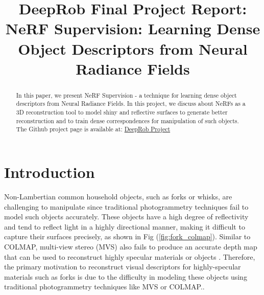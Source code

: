 \documentclass[conference]{IEEEtran}
\begin{document}
\title{DeepRob Final Project Report:\\NeRF Supervision: Learning Dense Object Descriptors from Neural Radiance Fields
}

\author{
\and
{}
\and
{}
}

\maketitle


\begin{abstract}
In this paper, we present NeRF Supervision \cite{yen2022nerfsupervision} - a technique for learning dense object descriptors from Neural Radiance Fields. In this project, we discuss about NeRFs as a 3D reconstruction tool to model shiny and reflective surfaces to generate better reconstruction and to train dense correspondences for manipulation of such objects.  
The Github project page is available at: \href{https://github.com/manuaatitya/rob599-final-project}{DeepRob Project}
\end{abstract}

\section{Introduction} 

Non-Lambertian common household objects, such as forks or whisks, are challenging to manipulate since traditional photogrammetry techniques fail to model such objects accurately. These objects have a high degree of reflectivity and tend to reflect light in a highly directional manner, making it difficult to capture their surfaces precisely, as shown in Fig (\ref{fig:fork_colmap}). Similar to COLMAP, multi-view stereo (MVS) also fails to produce an accurate depth map that can be used to reconstruct highly specular materials or objects \cite{yen2022nerfsupervision}. Therefore, the primary motivation to reconstruct visual descriptors for highly-specular materials such as forks is due to the difficulty in modeling these objects using traditional photogrammetry techniques like MVS or COLMAP.\cite{schoenberger2016sfm}. \vspace{2mm}
\end{document}
